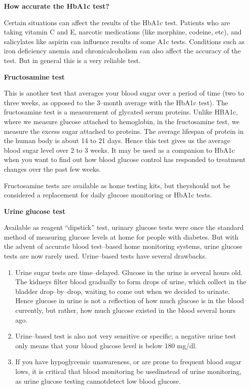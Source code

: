 \noindent\textbf{How accurate the HbA1c test?}

Certain situations can affect the results of the HbA1c test. Patients who are taking vitamin C and E, narcotic medications (like morphine, codeine, etc), and salicylates like aspirin can influence results of some A1c tests. Conditions such as iron deficiency anemia and chronic\break alcoholism can also affect the accuracy of the test. But in general this is a very reliable test.

\noindent\textbf{Fructosamine test}

This is another test that averages your blood sugar over a period of time (two to three weeks, as opposed to the 3–month average with the HbA1c test). The fructosamine test is a measurement of glycated serum proteins. Unlike HBA1c, where we measure glucose attached to hemoglobin, in the fructosamine test, we measure the excess sugar attached to proteins. The average lifespan of protein in the human body is about 14 to 21 days. Hence this test gives us the average blood sugar level over 2 to 3 weeks. It may be used as a companion to HbA1c when you want to find out how blood glucose control has responded to treatment changes over the past few weeks.

\clearpage

Fructosamine tests are available as home testing kits, but they\break should not be considered a replacement for daily glucose monitoring or HbA1c tests.

\noindent\textbf{Urine glucose test}

Available as reagent “dipstick” test, urinary glucose tests were once the standard method of measuring glucose levels at home for people with diabetes. But with the advent of accurate blood test–based home monitoring systems, urine glucose tests are now rarely used. Urine–based tests have several drawbacks.

\begin{enumerate}
\itemsep=0pt
\item Urine sugar tests are time–delayed. Glucose in the urine is seve\-ral hours old. The kidneys filter blood gradually to form drops of urine, which collect in the bladder drop–by–drop, waiting to come out when we decided to urinate. Hence glucose in urine is not a reflection of how much glucose is in the blood currently, but rather, how much glucose existed in the blood several hours ago.
\item Urine–based test is also not very sensitive or specific; a negative urine test only means that your blood glucose level is below 180 mg/dl.
\item If you have hypoglycemic unawareness, or are prone to frequent blood sugar lows, it is critical that blood monitoring be used\break instead of urine monitoring, as urine glucose testing cannot\break detect low blood glucose.
\end{enumerate}

